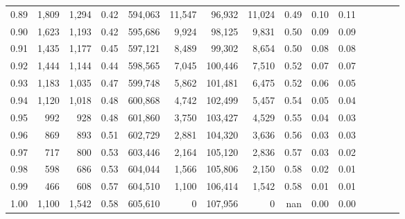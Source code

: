\begin{tabular}{rrrcrrrrrrrrrrr}
0.89 &   1,809 &  1,294 &                                       0.42 &  594,063 &   11,547 &   96,932 &   11,024 &  0.49 &  0.10 &                         0.11 \\
0.90 &   1,623 &  1,193 &                                       0.42 &  595,686 &    9,924 &   98,125 &    9,831 &  0.50 &  0.09 &                         0.09 \\
0.91 &   1,435 &  1,177 &                                       0.45 &  597,121 &    8,489 &   99,302 &    8,654 &  0.50 &  0.08 &                         0.08 \\
0.92 &   1,444 &  1,144 &                                       0.44 &  598,565 &    7,045 &  100,446 &    7,510 &  0.52 &  0.07 &                         0.07 \\
0.93 &   1,183 &  1,035 &                                       0.47 &  599,748 &    5,862 &  101,481 &    6,475 &  0.52 &  0.06 &                         0.05 \\
0.94 &   1,120 &  1,018 &                                       0.48 &  600,868 &    4,742 &  102,499 &    5,457 &  0.54 &  0.05 &                         0.04 \\
0.95 &     992 &    928 &                                       0.48 &  601,860 &    3,750 &  103,427 &    4,529 &  0.55 &  0.04 &                         0.03 \\
0.96 &     869 &    893 &                                       0.51 &  602,729 &    2,881 &  104,320 &    3,636 &  0.56 &  0.03 &                         0.03 \\
0.97 &     717 &    800 &                                       0.53 &  603,446 &    2,164 &  105,120 &    2,836 &  0.57 &  0.03 &                         0.02 \\
0.98 &     598 &    686 &                                       0.53 &  604,044 &    1,566 &  105,806 &    2,150 &  0.58 &  0.02 &                         0.01 \\
0.99 &     466 &    608 &                                       0.57 &  604,510 &    1,100 &  106,414 &    1,542 &  0.58 &  0.01 &                         0.01 \\
1.00 &   1,100 &  1,542 &                                       0.58 &  605,610 &        0 &  107,956 &        0 &   nan &  0.00 &                         0.00 \\
\bottomrule
\end{tabular}
